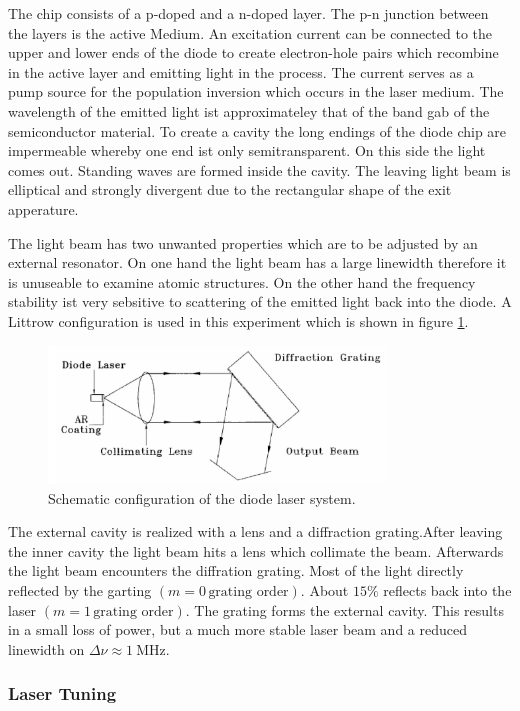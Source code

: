 The chip consists of a p-doped and a n-doped layer. The p-n junction between the layers is the active Medium.
An excitation current can be connected to the upper and lower ends of the diode to create electron-hole pairs which recombine in the active layer and
emitting light in the process. The current serves as a pump source for the population inversion which occurs in the laser medium.
The wavelength of the emitted light ist approximateley that of the band gab of the semiconductor material.
To create a cavity the long endings of the diode chip are impermeable whereby one end ist only semitransparent.
On this side the light comes out.
Standing waves are formed inside the cavity. The leaving light beam is elliptical and strongly divergent due to the  rectangular shape of the
exit apperature.

The light beam has two unwanted properties which are to be adjusted by an external resonator.
On one hand the light beam has a large linewidth therefore it is unuseable to examine atomic structures.
On the other hand the frequency stability ist very sebsitive to scattering of the emitted light back into the diode.
A Littrow configuration is used in this experiment which is shown in figure \ref{fig:configuration}. 

\begin{figure}[H]
    \centering
    \includegraphics[width=0.8\textwidth]{content/graphics/configuration.jpg}
    \caption{Schematic configuration of the diode laser system.} %
    \label{fig:configuration}
\end{figure}

The external cavity is realized with a lens and a diffraction grating.After leaving the inner cavity the light beam hits a lens which collimate the beam.
Afterwards the light beam encounters the diffration grating. Most of the light directly reflected by the garting  $\left(m = 0 \, \text{grating order}\right)$.
About $ 15 \% $ reflects back into the laser $\left(m = 1  \,\text{grating order}\right)$. The grating forms the external cavity.
This results in a small loss of power, but a much more stable laser beam and a reduced linewidth on $\Delta \nu \approx \qty{1}{\mega\hertz}$.

\subsubsection{Laser Tuning}
\label{sec:Laser Tuning}